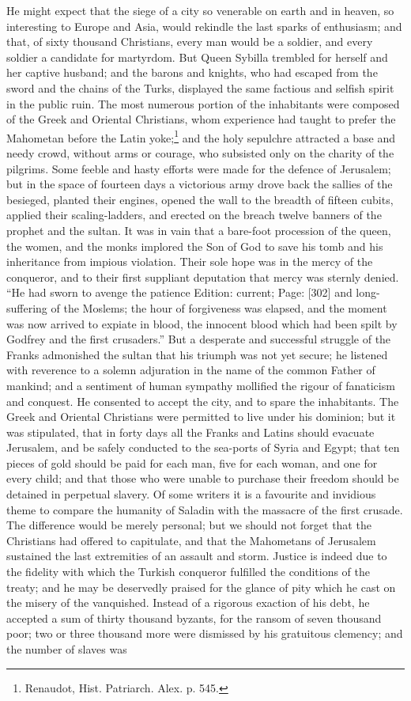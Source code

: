 He might expect that the siege of a city so venerable on earth and in heaven, so interesting to Europe and Asia, would rekindle the last sparks of enthusiasm; and that, of sixty thousand Christians, every man would be a soldier, and every soldier a candidate for martyrdom. But Queen Sybilla trembled for herself and her captive husband; and the barons and knights, who had escaped from the sword and the chains of the Turks, displayed the same factious and selfish spirit in the public ruin. The most numerous portion of the inhabitants were composed of the Greek and Oriental Christians, whom experience had taught to prefer the Mahometan before the Latin yoke;\footnote{Renaudot, Hist. Patriarch. Alex. p. 545.} and the holy sepulchre attracted a base and needy crowd, without arms or courage, who subsisted only on the charity of the pilgrims. Some feeble and hasty efforts were made for the defence of Jerusalem; but in the space of fourteen days a victorious army drove back the sallies of the besieged, planted their engines, opened the wall to the breadth of fifteen cubits, applied their scaling-ladders, and erected on the breach twelve banners of the prophet and the sultan. It was in vain that a bare-foot procession of the queen, the women, and the monks implored the Son of God to save his tomb and his inheritance from impious violation. Their sole hope was in the mercy of the conqueror, and to their first suppliant deputation that mercy was sternly denied. \texthebrew{“}He had sworn to avenge the patience Edition: current; Page: [302] and long-suffering of the Moslems; the hour of forgiveness was elapsed, and the moment was now arrived to expiate in blood, the innocent blood which had been spilt by Godfrey and the first crusaders.\texthebrew{}” But a desperate and successful struggle of the Franks admonished the sultan that his triumph was not yet secure; he listened with reverence to a solemn adjuration in the name of the common Father of mankind; and a sentiment of human sympathy mollified the rigour of fanaticism and conquest. He consented to accept the city, and to spare the inhabitants. The Greek and Oriental Christians were permitted to live under his dominion; but it was stipulated, that in forty days all the Franks and Latins should evacuate Jerusalem, and be safely conducted to the sea-ports of Syria and Egypt; that ten pieces of gold should be paid for each man, five for each woman, and one for every child; and that those who were unable to purchase their freedom should be detained in perpetual slavery. Of some writers it is a favourite and invidious theme to compare the humanity of Saladin with the massacre of the first crusade. The difference would be merely personal; but we should not forget that the Christians had offered to capitulate, and that the Mahometans of Jerusalem sustained the last extremities of an assault and storm. Justice is indeed due to the fidelity with which the Turkish conqueror fulfilled the conditions of the treaty; and he may be deservedly praised for the glance of pity which he cast on the misery of the vanquished. Instead of a rigorous exaction of his debt, he accepted a sum of thirty thousand byzants, for the ransom of seven thousand poor; two or three thousand more were dismissed by his gratuitous clemency; and the number of slaves was 